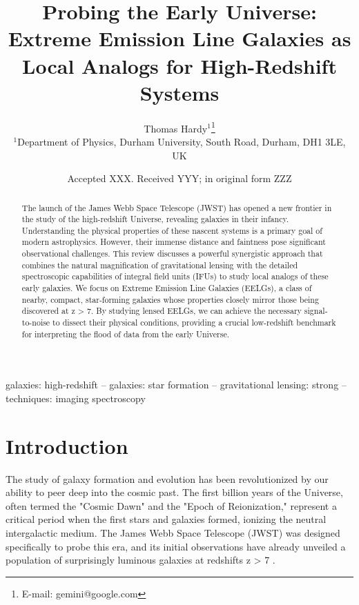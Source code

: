 \documentclass[fleqn,usenatbib]{mnras}
\title[EELGs as High-Redshift Analogs]{Probing the Early Universe: Extreme Emission Line Galaxies as Local Analogs for High-Redshift Systems}
\author[T. Hardy]{
Thomas Hardy$^{1}$\thanks{E-mail: gemini@google.com}
\\
$^{1}$Department of Physics, Durham University, South Road, Durham, DH1 3LE, UK
}
\date{Accepted XXX. Received YYY; in original form ZZZ}
\begin{document}
\label{firstpage}
\pagerange{\pageref{firstpage}--\pageref{lastpage}}
\maketitle

\begin{abstract}
The launch of the James Webb Space Telescope (JWST) has opened a new frontier in the study of the high-redshift Universe, revealing galaxies in their infancy. Understanding the physical properties of these nascent systems is a primary goal of modern astrophysics. However, their immense distance and faintness pose significant observational challenges. This review discusses a powerful synergistic approach that combines the natural magnification of gravitational lensing with the detailed spectroscopic capabilities of integral field units (IFUs) to study local analogs of these early galaxies. We focus on Extreme Emission Line Galaxies (EELGs), a class of nearby, compact, star-forming galaxies whose properties closely mirror those being discovered at z > 7. By studying lensed EELGs, we can achieve the necessary signal-to-noise to dissect their physical conditions, providing a crucial low-redshift benchmark for interpreting the flood of data from the early Universe.
\end{abstract}

\begin{keywords}
galaxies: high-redshift -- galaxies: star formation -- gravitational lensing: strong -- techniques: imaging spectroscopy
\end{keywords}

\section{Introduction}

The study of galaxy formation and evolution has been revolutionized by our ability to peer deep into the cosmic past. The first billion years of the Universe, often termed the "Cosmic Dawn" and the "Epoch of Reionization," represent a critical period when the first stars and galaxies formed, ionizing the neutral intergalactic medium. The James Webb Space Telescope (JWST) was designed specifically to probe this era, and its initial observations have already unveiled a population of surprisingly luminous galaxies at redshifts z > 7 \citep{Rhoads2023}.
\end{document}
